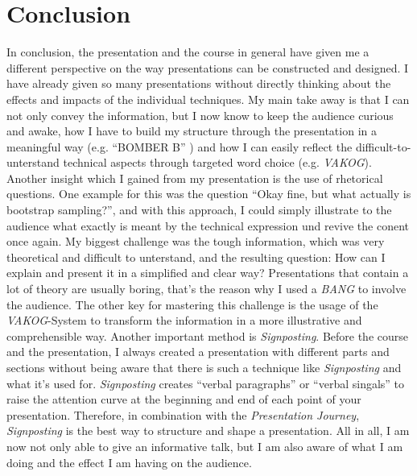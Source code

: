 \chapter{Conclusion}

In conclusion, the presentation and the course in general have given me a different perspective on the way presentations can be constructed and designed. I have already given so many presentations without directly thinking about the effects and impacts of the individual techniques. My main take away is that I can not only convey the information, but I now know to keep the audience curious and awake, how I have to build my structure through the presentation in a meaningful way (e.g. \enquote{BOMBER B} \autocite[]{bomberb}) and how I can easily reflect the difficult-to-unterstand technical aspects through targeted word choice (e.g. \textit{VAKOG}). Another insight which I gained from my presentation is the use of rhetorical questions. One example for this was the question \enquote{Okay fine, but what actually is bootstrap sampling?}, and with this approach, I could simply illustrate to the audience what exactly is meant by the technical expression und revive the conent once again. My biggest challenge was the tough information, which was very theoretical and difficult to unterstand, and the resulting question: How can I explain and present it in a simplified and clear way? Presentations that contain a lot of theory are usually boring, that's the reason why I used a \textit{BANG} to involve the audience. The other key for mastering this challenge is the usage of the \textit{VAKOG}-System to transform the information in a more illustrative and comprehensible way. Another important method is \textit{Signposting}. Before the course and the presentation, I always created a presentation with different parts and sections without being aware that there is such a technique like \textit{Signposting} and what it's used for. \textit{Signposting} creates \enquote{verbal paragraphs} or \enquote{verbal singals} to raise the attention curve at the beginning and end of each point of your presentation. Therefore, in combination with the \textit{Presentation Journey}, \textit{Signposting} is the best way to structure and shape a presentation. All in all, I am now not only able to give an informative talk, but I am also aware of what I am doing and the effect I am having on the audience.